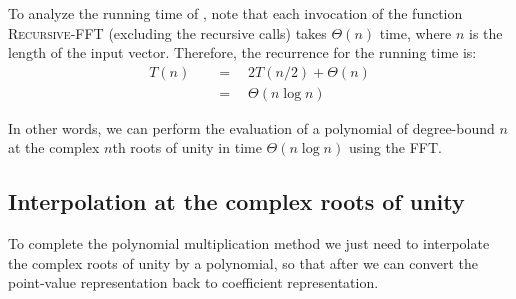 To analyze the running time of , note that each invocation
of the function \textsc{Recursive-FFT} (excluding the recursive calls) takes
$\Theta(n)$ time, where $n$ is the length of the input vector. Therefore, the
recurrence for the running time is:
\begin{align*}
  T(n) \quad &= \quad 2T(n / 2) + \Theta(n) \\
             &= \quad \Theta(n \log{n})
\end{align*}

In other words, we can perform the evaluation of a polynomial of degree-bound
$n$ at the complex $n$th roots of unity in time $\Theta(n \log{n})$ using the
FFT.

\subsection{Interpolation at the complex roots of unity}
To complete the polynomial multiplication method we just need to interpolate
the complex roots of unity by a polynomial, so that after we can convert the
point-value representation back to coefficient representation.

